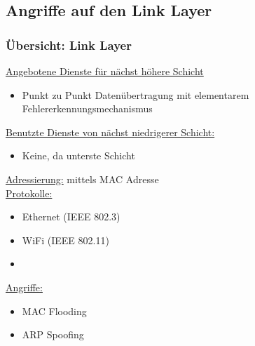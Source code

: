 \subsection{Angriffe auf den Link Layer}
\subsubsection*{Übersicht: Link Layer}
\underline{Angebotene Dienste für nächst höhere Schicht}
\begin{itemize}
    \item Punkt zu Punkt Datenübertragung mit elementarem Fehlererkennungsmechanismus
\end{itemize}
\underline{Benutzte Dienste von nächst niedrigerer Schicht:}
\begin{itemize}
    \item Keine, da unterste Schicht
\end{itemize}
\underline{Adressierung:} mittels MAC Adresse\\
\underline{Protokolle:}
\begin{itemize}
    \item Ethernet (IEEE 802.3)
    \item WiFi (IEEE 802.11)
    \item {}
\end{itemize}
\underline{Angriffe:}
\begin{itemize}
    \item MAC Flooding
    \item ARP Spoofing
\end{itemize}
